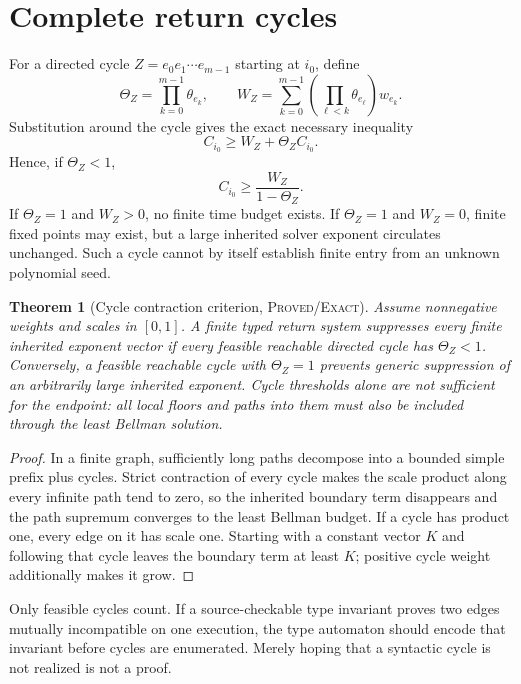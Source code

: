 \documentclass[11pt]{article}
\newtheorem{theorem}{Theorem}[section]
\begin{document}
\section{Complete return cycles}

For a directed cycle \(Z=e_0e_1\cdots e_{m-1}\) starting at \(i_0\), define
\[
 \Theta_Z=\prod_{k=0}^{m-1}\theta_{e_k},
 \qquad
 W_Z=\sum_{k=0}^{m-1}
 \left(\prod_{\ell<k}\theta_{e_\ell}\right)w_{e_k}.
\]
Substitution around the cycle gives the exact necessary inequality
\[
 C_{i_0}\ge W_Z+\Theta_Z C_{i_0}.
\]
Hence, if \(\Theta_Z<1\),
\begin{equation}
 C_{i_0}\ge \frac{W_Z}{1-\Theta_Z}.
 \label{eq:cyclethreshold}
\end{equation}
If \(\Theta_Z=1\) and \(W_Z>0\), no finite time budget exists.  If
\(\Theta_Z=1\) and \(W_Z=0\), finite fixed points may exist, but a large
inherited solver exponent circulates unchanged.  Such a cycle cannot by
itself establish finite entry from an unknown polynomial seed.

\begin{theorem}[Cycle contraction criterion, \textsc{Proved/Exact}]
Assume nonnegative weights and scales in \([0,1]\).  A finite typed return
system suppresses every finite inherited exponent vector if every feasible
reachable directed cycle has \(\Theta_Z<1\).  Conversely, a feasible
reachable cycle with \(\Theta_Z=1\) prevents generic suppression of an
arbitrarily large inherited exponent.  Cycle thresholds alone are not
sufficient for the endpoint: all local floors and paths into them must also
be included through the least Bellman solution.
\end{theorem}

\begin{proof}
In a finite graph, sufficiently long paths decompose into a bounded simple
prefix plus cycles.  Strict contraction of every cycle makes the scale
product along every infinite path tend to zero, so the inherited boundary
term disappears and the path supremum converges to the least Bellman budget.
If a cycle has product one, every edge on it has scale one.  Starting with a
constant vector \(K\) and following that cycle leaves the boundary term at
least \(K\); positive cycle weight additionally makes it grow.
\end{proof}

Only feasible cycles count.  If a source-checkable type invariant proves two
edges mutually incompatible on one execution, the type automaton should
encode that invariant before cycles are enumerated.  Merely hoping that a
syntactic cycle is not realized is not a proof.
\end{document}
